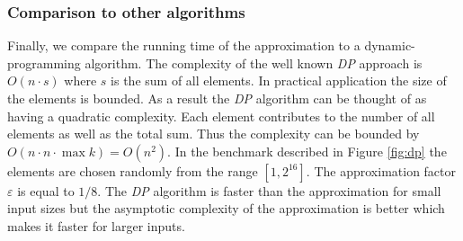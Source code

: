 \subsubsection{Comparison to other algorithms}

Finally, we compare the running time of the approximation to a dynamic-programming algorithm. The complexity of the well known \textit{DP} approach is $O (n \cdot s)$ where $s$ is the sum of all elements. In practical application the size of the elements is bounded. As a result the \textit{DP} algorithm can be thought of as having a quadratic complexity. Each element contributes to the number of all elements as well as the total sum. Thus the complexity can be bounded by $ O(n \cdot n \cdot \max{k}) = O(n^2 ) $. In the benchmark described in Figure \ref{fig:dp} the elements are chosen randomly from the range $[1, 2^{16}]$. The approximation factor $\varepsilon$ is equal to $1/8$. The \textit{DP} algorithm is faster than the approximation for small input sizes but the asymptotic complexity of the approximation is better which makes it faster for larger inputs.





